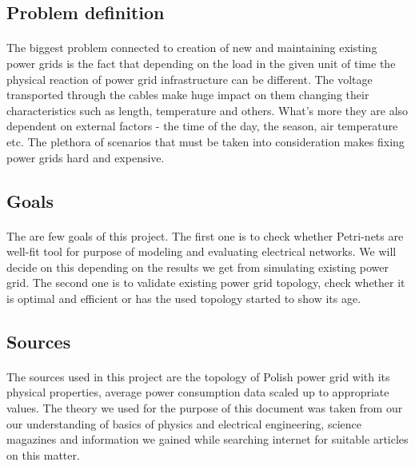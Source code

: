 \documentclass[a4paper]{article}
\begin{document}
\subsection{Problem definition}
\label{sec:problemDefinition}
\paragraph{}

The biggest problem connected to creation of new and maintaining existing power grids is the fact that depending on the load in the given unit of time the physical reaction of power grid infrastructure can be different. The voltage transported through the cables make huge impact on them changing their characteristics such as length, temperature and others. What's more they are also dependent on external factors - the time of the day, the season, air temperature etc. The plethora of scenarios that must be taken into consideration makes fixing power grids hard and expensive.

\subsection{Goals} 
\label{sec:goals}
\paragraph{}

The are few goals of this project. The first one is to check whether Petri-nets are well-fit tool for purpose of modeling and evaluating electrical networks. We will decide on this depending on the results we get from simulating existing power grid. The second one is to validate existing power grid topology, check whether it is optimal and efficient or has the used topology started to show its age. 

\subsection{Sources}
\label{sec:sources}
\paragraph{}
The sources used in this project are the topology of Polish power grid with its physical properties, average power consumption data scaled up to appropriate values. The theory we used for the purpose of this document was taken from our our understanding of basics of physics and electrical engineering, science magazines and information we gained while searching internet for suitable articles on this matter.
\end{document}
